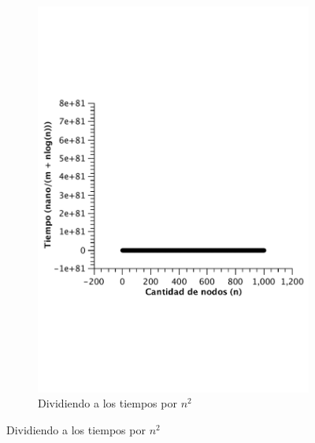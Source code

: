 \begin{figure}[H]
        \centering
        \begin{subfigure}[b]{0.5\textwidth}
                \includegraphics[width=\textwidth]{imagenes/vacio-listas-3.pdf}
                \caption{Dividiendo a los tiempos por $n^2$}
        \end{subfigure}


\end{figure}
